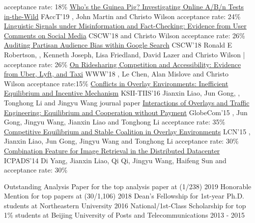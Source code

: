 \documentclass[letterpaper]{awesome-cv}
\begin{document}
\begin{cventries}
    {acceptance rate: 18\%}
  \cvpub
    {\href{https://shanjiang.me/publications/facct19_paper.pdf}{Who's the Guinea Pig? Investigating Online A/B/n Tests in-the-Wild}}
    {FAccT'19}
    {, John Martin and Christo Wilson}
    {acceptance rate: 24\%}
  \cvpub
    {\href{https://shanjiang.me/publications/cscw18a_paper.pdf}{Linguistic Signals under Misinformation and Fact-Checking: Evidence from User Comments on Social Media}}
    {CSCW'18}
    { and Christo Wilson}
    {acceptance rate: 26\%}
  \cvpub
    {\href{https://shanjiang.me/publications/cscw18b_paper.pdf}{Auditing Partisan Audience Bias within Google Search}}
    {CSCW'18}
    {Ronald E Robertson, , Kenneth Joseph, Lisa Friedland, David Lazer and Christo Wilson}
    { | acceptance rate: 26\%}
  \cvpub
    {\href{https://shanjiang.me/publications/www18_paper.pdf}{On Ridesharing Competition and Accessibility: Evidence from Uber, Lyft, and Taxi}}
    {WWW'18}
    {, Le Chen, Alan Mislove and Christo Wilson}
    {acceptance rate:15\%}
  \cvpub
    {\href{https://shanjiang.me/publications/tiis16_paper.pdf}{Conflicts in Overlay Environments: Inefficient Equilibrium and Incentive Mechanism}}
    {KSII-TIIS'16}
    {Jianxin Liao, Jun Gong, , Tonghong Li and Jingyu Wang}
    {journal paper}
  \cvpub
    {\href{https://shanjiang.me/publications/globecom15_paper.pdf}{Interactions of Overlays and Traffic Engineering: Equilibrium and Cooperation without Payment}}
    {GlobeCom'15}
    {, Jun Gong, Jingyu Wang, Jianxin Liao and Tonghong Li}
    {acceptance rate: 35\%}
  \cvpub
    {\href{https://shanjiang.me/publications/lcn15_paper.pdf}{Competitive Equilibrium and Stable Coalition in Overlay Environments}}
    {LCN'15}
    {, Jianxin Liao, Jun Gong, Jingyu Wang and Tonghong Li}
    {acceptance rate: 30\%}
  \cvpub
    {\href{https://shanjiang.me/publications/icpads14_paper.pdf}{Combination Feature for Image Retrieval in the Distributed Datacenter}}
    {ICPADS'14}
    {Di Yang, Jianxin Liao, Qi Qi, Jingyu Wang, Haifeng Sun and }
    {acceptance rate: 30\%}
\end{cventries}

\addvspace{2ex}
\begin{cventries}
  \cvaward
    {Outstanding Analysis Paper}
    {for the top analysis paper at  (1/238)}
    {2019}
  \cvaward
    {Honorable Mention}
    {for top papers at  (30/1,106)}
    {2018}
  \cvaward
    {Dean's Fellowship}
    {for 1st-year Ph.D. students at Northeastern University}
    {2016}
  \cvaward
    {National/1st-Class Scholarship}
    {for top 1\% students at Beijing University of Posts and Telecommunications}
    {2013 - 2015}
\end{cventries}
\end{document}
